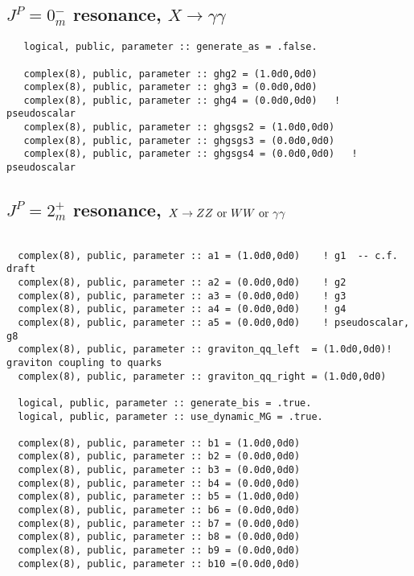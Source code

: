 \documentclass[aps,superscriptaddress,nofootinbib]{revtex4}
\begin{document}
\subsection{ $J^P = 0^-_m$ resonance, $X \to \gamma \gamma$}
\label{sec:exD}

\begin{verbatim}
   logical, public, parameter :: generate_as = .false.

   complex(8), public, parameter :: ghg2 = (1.0d0,0d0)
   complex(8), public, parameter :: ghg3 = (0.0d0,0d0)
   complex(8), public, parameter :: ghg4 = (0.0d0,0d0)   ! pseudoscalar
   complex(8), public, parameter :: ghgsgs2 = (1.0d0,0d0)
   complex(8), public, parameter :: ghgsgs3 = (0.0d0,0d0)
   complex(8), public, parameter :: ghgsgs4 = (0.0d0,0d0)   ! pseudoscalar 
\end{verbatim}

\subsection{ $J^P = 2^+_m$ resonance, $X \to ZZ~{\rm or}~WW~{\rm or}~\gamma \gamma$}

\begin{verbatim}

  complex(8), public, parameter :: a1 = (1.0d0,0d0)    ! g1  -- c.f. draft
  complex(8), public, parameter :: a2 = (0.0d0,0d0)    ! g2
  complex(8), public, parameter :: a3 = (0.0d0,0d0)    ! g3
  complex(8), public, parameter :: a4 = (0.0d0,0d0)    ! g4
  complex(8), public, parameter :: a5 = (0.0d0,0d0)    ! pseudoscalar, g8
  complex(8), public, parameter :: graviton_qq_left  = (1.0d0,0d0)! graviton coupling to quarks
  complex(8), public, parameter :: graviton_qq_right = (1.0d0,0d0)
  
  logical, public, parameter :: generate_bis = .true.
  logical, public, parameter :: use_dynamic_MG = .true.

  complex(8), public, parameter :: b1 = (1.0d0,0d0)
  complex(8), public, parameter :: b2 = (0.0d0,0d0)
  complex(8), public, parameter :: b3 = (0.0d0,0d0)
  complex(8), public, parameter :: b4 = (0.0d0,0d0)
  complex(8), public, parameter :: b5 = (1.0d0,0d0)
  complex(8), public, parameter :: b6 = (0.0d0,0d0)
  complex(8), public, parameter :: b7 = (0.0d0,0d0)
  complex(8), public, parameter :: b8 = (0.0d0,0d0)
  complex(8), public, parameter :: b9 = (0.0d0,0d0)
  complex(8), public, parameter :: b10 =(0.0d0,0d0) 

\end{verbatim}
\end{document}
